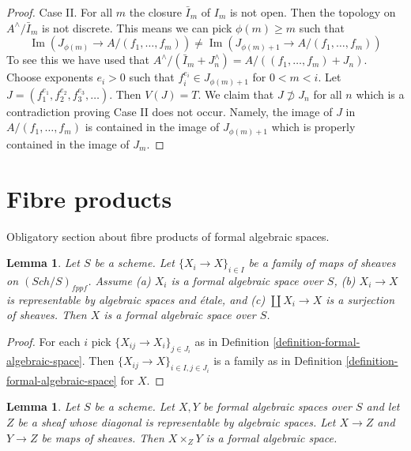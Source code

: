 \documentclass{stacks-project}
\theoremstyle{plain}
\newtheorem{lemma}[subsection]{Lemma}
\theoremstyle{definition}
\theoremstyle{remark}
\numberwithin{equation}{subsection}
\def\Sch{\mathit{Sch}}
\def\Im{\mathop{\mathrm{Im}}}
\begin{document}
\begin{proof}
\medskip\noindent
Case II. For all $m$ the closure $\bar I_m$ of $I_m$ is not open.
Then the topology on $A^\wedge/\bar I_m$ is not discrete. This means
we can pick $\phi(m) \geq m$ such that
$$
\Im(J_{\phi(m)} \to A/(f_1, \ldots, f_m)) \not =
\Im(J_{\phi(m) + 1} \to A/(f_1, \ldots, f_m))
$$
To see this we have used that
$A^\wedge/(\bar I_m + J_n^\wedge) = A/((f_1, \ldots, f_m) + J_n)$.
Choose exponents $e_i > 0$ such that $f_i^{e_i} \in J_{\phi(m) + 1}$
for $0 < m < i$. Let $J = (f_1^{e_1}, f_2^{e_2}, f_3^{e_3}, \ldots)$.
Then $V(J) = T$. We claim that $J \not \supset J_n$ for all $n$
which is a contradiction proving Case II does not occur.
Namely, the image of $J$ in $A/(f_1, \ldots, f_m)$ is contained
in the image of $J_{\phi(m) + 1}$ which is properly contained in the
image of $J_m$.
\end{proof}
















\section{Fibre products}
\label{section-fibre-products}

\noindent
Obligatory section about fibre products of formal algebraic spaces.

\begin{lemma}
\label{lemma-etale-covering-by-formal-algebraic-spaces}
Let $S$ be a scheme. Let $\{X_i \to X\}_{i \in I}$ be a family of maps
of sheaves on $(\Sch/S)_{fppf}$. Assume (a) $X_i$ is a
formal algebraic space over $S$, (b) $X_i \to X$ is representable
by algebraic spaces and \'etale, and (c) $\coprod X_i \to X$
is a surjection of sheaves. Then $X$ is a formal algebraic space
over $S$.
\end{lemma}

\begin{proof}
For each $i$ pick $\{X_{ij} \to X_i\}_{j \in J_i}$ as in
Definition \ref{definition-formal-algebraic-space}.
Then $\{X_{ij} \to X\}_{i \in I, j \in J_i}$ is a family
as in Definition \ref{definition-formal-algebraic-space}
for $X$.
\end{proof}

\begin{lemma}
\label{lemma-fibre-products-general}
Let $S$ be a scheme. Let $X, Y$ be formal algebraic spaces over $S$
and let $Z$ be a sheaf whose diagonal is representable by
algebraic spaces. Let $X \to Z$ and $Y \to Z$ be maps of sheaves.
Then $X \times_Z Y$ is a formal algebraic space.
\end{lemma}
\end{document}
